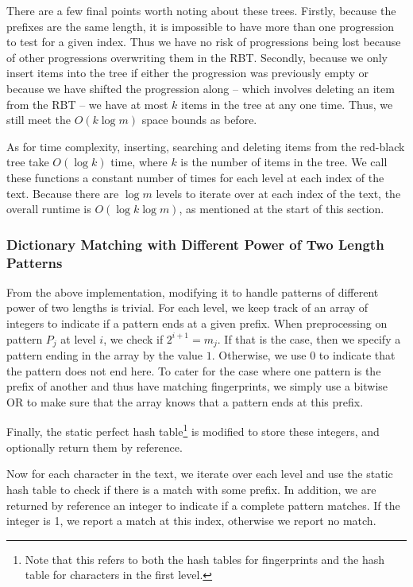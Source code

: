 \documentclass[ %
                    author={Dominic Joseph Moylett},
                    degree={MEng},
                     title={Dictionary Matching with Fingerprints},
                  subtitle={An Empirical Analysis},
                      type={research},
                      year={2015} ]{dissertation}
\begin{document}
There are a few final points worth noting about these trees. Firstly, because the prefixes are the same length, it is impossible to have more than one progression to test for a given index. Thus we have no risk of progressions being lost because of other progressions overwriting them in the RBT. Secondly, because we only insert items into the tree if either the progression was previously empty or because we have shifted the progression along -- which involves deleting an item from the RBT -- we have at most $k$ items in the tree at any one time. Thus, we still meet the $O(k\log m)$ space bounds as before.

As for time complexity, inserting, searching and deleting items from the red-black tree take $O(\log k)$ time, where $k$ is the number of items in the tree. We call these functions a constant number of times for each level at each index of the text. Because there are $\log m$ levels to iterate over at each index of the text, the overall runtime is $O(\log k\log m)$, as mentioned at the start of this section.

\subsubsection{Dictionary Matching with Different Power of Two Length Patterns}

From the above implementation, modifying it to handle patterns of different power of two lengths is trivial. For each level, we keep track of an array of integers to indicate if a pattern ends at a given prefix. When preprocessing on pattern $P_j$ at level $i$, we check if $2^{i + 1} = m_j$. If that is the case, then we specify a pattern ending in the array by the value $1$. Otherwise, we use $0$ to indicate that the pattern does not end here. To cater for the case where one pattern is the prefix of another and thus have matching fingerprints, we simply use a bitwise OR to make sure that the array knows that a pattern ends at this prefix.

Finally, the static perfect hash table\footnote{Note that this refers to both the hash tables for fingerprints and the hash table for characters in the first level.} is modified to store these integers, and optionally return them by reference.

Now for each character in the text, we iterate over each level and use the static hash table to check if there is a match with some prefix. In addition, we are returned by reference an integer to indicate if a complete pattern matches. If the integer is 1, we report a match at this index, otherwise we report no match.
\end{document}

